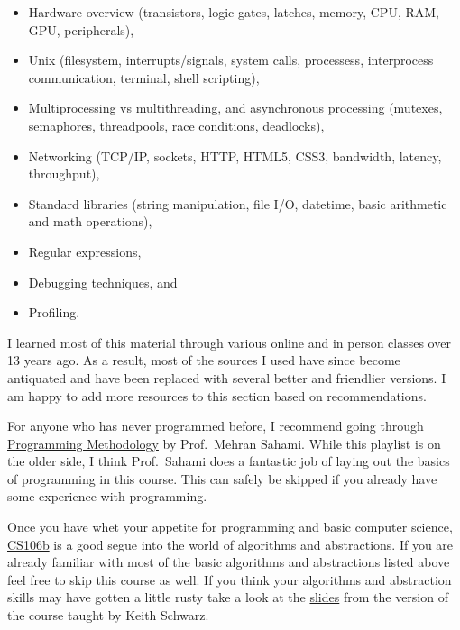 \begin{itemize}
\tightlist
\item
  Hardware overview (transistors, logic gates, latches, memory, CPU,
  RAM, GPU, peripherals),
\item
  Unix (filesystem, interrupts/signals, system calls, processess,
  interprocess communication, terminal, shell scripting),
\item
  Multiprocessing vs multithreading, and asynchronous processing
  (mutexes, semaphores, threadpools, race conditions, deadlocks),
\item
  Networking (TCP/IP, sockets, HTTP, HTML5, CSS3, bandwidth, latency,
  throughput),
\item
  Standard libraries (string manipulation, file I/O, datetime, basic
  arithmetic and math operations),
\item
  Regular expressions,
\item
  Debugging techniques, and
\item
  Profiling.
\end{itemize}

I learned most of this material through various online and in person
classes over 13 years ago. As a result, most of the sources I used have
since become antiquated and have been replaced with several better and
friendlier versions. I am happy to add more resources to this section
based on recommendations.

For anyone who has never programmed before, I recommend going through
\href{https://www.youtube.com/watch?v=KkMDCCdjyW8\&list=PL84A56BC7F4A1F852}{Programming
Methodology} by Prof.~Mehran Sahami. While this playlist is on the older
side, I think Prof.~Sahami does a fantastic job of laying out the basics
of programming in this course. This can safely be skipped if you already
have some experience with programming.

Once you have whet your appetite for programming and basic computer
science,
\href{https://www.youtube.com/watch?v=FIroM06V2MA\&list=PL-h0BZdG_K4kAmsfvAik-Za826pNbQd0d}{CS106b}
is a good segue into the world of algorithms and abstractions. If you
are already familiar with most of the basic algorithms and abstractions
listed above feel free to skip this course as well. If you think your
algorithms and abstraction skills may have gotten a little rusty take a
look at the
\href{https://web.stanford.edu/class/archive/cs/cs106b/cs106b.1214/}{slides}
from the version of the course taught by Keith Schwarz.

